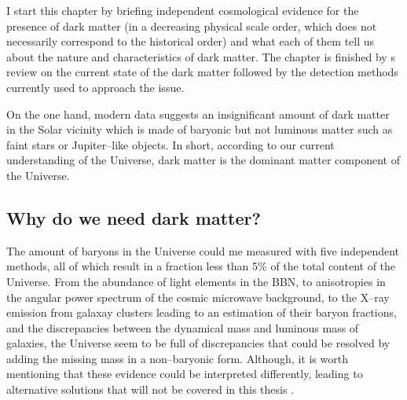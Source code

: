 \documentclass[paper=a4, fontsize=11pt]{scrartcl} %
\numberwithin{equation}{section} %
\numberwithin{figure}{section} %
\numberwithin{table}{section} %
\begin{document}
I start this chapter by briefing independent cosmological evidence for the presence of dark matter (in a decreasing physical scale order, which does not necessarily correspond to the historical order) and what each of them tell us about the nature and characteristics of dark matter. The chapter is finished by s review on the  current state of the dark matter followed by the detection methods currently used to approach the issue.

On the one hand, modern data suggests an insignificant amount of dark matter in the Solar vicinity which is made of baryonic but not luminous matter such as faint stars or Jupiter--like objects. In short, according to our current understanding of the Universe, dark matter is the dominant matter component of the Universe.


\subsection{Why do we need dark matter?}

The amount of baryons in the Universe could me measured with five independent methods, all of which result in a fraction less than 5\% of the total content of the Universe. From the abundance of light elements in the BBN, to anisotropies in the angular power spectrum of the cosmic microwave background, to the X--ray emission from galaxay clusters leading to an estimation of their baryon fractions, and the discrepancies between the dynamical mass and luminous mass of galaxies, the Universe seem to be full of discrepancies that could be resolved by adding the missing mass in a non--baryonic form. Although, it is worth mentioning that these evidence could be interpreted differently, leading to alternative solutions that will not be covered in this thesis \citep[but see e.g. ][]{}.

\end{document}
